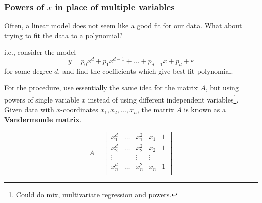 \documentclass{beamer}
\theoremstyle{example}
\begin{document}
\begin{frame}
    \frametitle{Powers of $x$ in place of multiple variables}
    Often, a linear model does not seem like a good fit for our data. What about trying to fit the data to a polynomial?

    \pause
    i.e., consider the model 
        \[y = p_0x^d + p_1x^{d-1} + \ldots + p_{d-1}x + p_d + \varepsilon\]
    for some degree $d$, and find the coefficients which give best fit polynomial.
    
    \pause
    For the procedure, use essentially the same idea for the matrix $A$, but using powers of single variable $x$ instead of using different independent variables\footnote{Could do mix, multivariate regression and powers.}. Given data with $x$-coordinates $x_1,x_2,\ldots,x_n$, the matrix $A$ is known as a \textbf{Vandermonde matrix}.
    \pause
    
    {\footnotesize
    \[A = \begin{bmatrix}x_1^d & \ldots & x_1^2 & x_1 & 1 \\ x_2^d & \ldots & x_2^2 & x_2 & 1 \\ 
        \vdots & & \vdots & \vdots \\
        x_n^d & \ldots & x_n^2 & x_n & 1 \\ \end{bmatrix}\]
    }
\end{frame}
\end{document}
